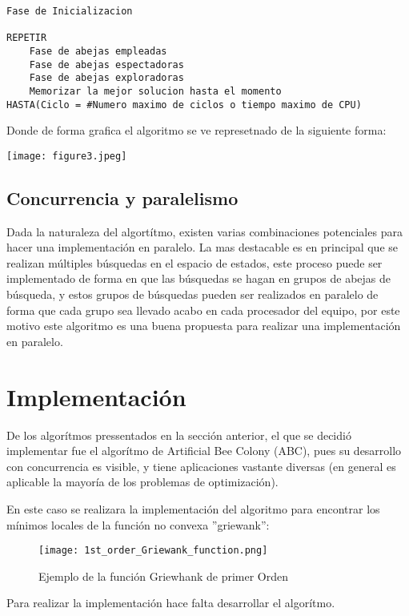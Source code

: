 \documentclass{article}
\begin{document}
\begin{lstlisting}
Fase de Inicializacion

REPETIR
    Fase de abejas empleadas
    Fase de abejas espectadoras
    Fase de abejas exploradoras
    Memorizar la mejor solucion hasta el momento
HASTA(Ciclo = #Numero maximo de ciclos o tiempo maximo de CPU)
\end{lstlisting}  

Donde de forma grafica el algoritmo se ve represetnado de la siguiente forma:

\begin{center}
    \texttt{[image: figure3.jpeg]} 
\end{center}
 
\subsection{Concurrencia y paralelismo}
 
Dada la naturaleza del algort\'itmo, existen varias combinaciones potenciales para hacer una implementación en paralelo. La mas destacable es en principal que se realizan múltiples búsquedas en el espacio de estados, este proceso puede ser implementado de forma en que las búsquedas se hagan en grupos de abejas de búsqueda, y estos grupos de búsquedas pueden ser realizados en paralelo de forma que cada grupo sea llevado acabo en cada procesador del equipo, por este motivo este algoritmo es una buena propuesta para realizar una implementaci\'on en paralelo. 


\section{Implementaci\'on}
De los algor\'itmos pressentados en la secci\'on anterior, el que se decidi\'o implementar fue el algor\'itmo de Artificial Bee Colony (ABC), pues su desarrollo con concurrencia es visible, y tiene aplicaciones vastante diversas (en general es aplicable la mayor\'ia de los problemas de optimizaci\'on). 

En este caso se realizara la implementación del algoritmo para encontrar los mínimos locales de la función no convexa ''griewank'':

\begin{figure}[h]
\caption{Ejemplo de la función Griewhank de primer Orden}
\centering
\texttt{[image: 1st\_order\_Griewank\_function.png]}
\end{figure}

\medskip
Para realizar la implementaci\'on hace falta desarrollar el algor\'itmo.
\end{document}
